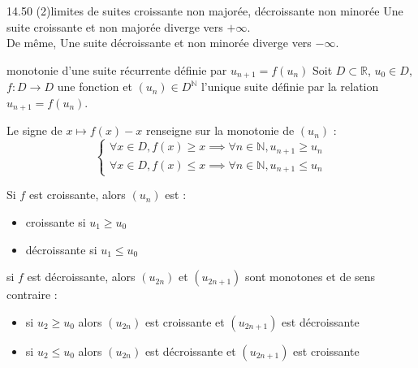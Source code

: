 \begin{adjustwidth}{-3cm}{-3cm}
\begin{proposition}{14.50 (2)}{limites de suites croissante non majorée, décroissante non minorée}
    Une suite croissante et non majorée diverge vers $+ \infty$.\\
    De même, Une suite décroissante et non minorée diverge vers $- \infty$.
\end{proposition}

\begin{theoreme}{14.65}{monotonie d'une suite récurrente définie par $u_{n+1} = f(u_n)$}
    Soit $D \subset \mathbb{R}$, $u_0 \in D$, $f:D \rightarrow D$ une fonction et $(u_n) \in D^{\mathbb{N}}$ l'unique suite définie par la relation $u_{n+1} = f(u_n)$.
        \begin{enumeratebf}
            \item Le signe de $x \mapsto f(x) - x$ renseigne sur la monotonie de $(u_n)$ :\begin{equation*}\begin{cases}
                \forall x \in D, f(x) \geq x \implies \forall n \in \mathbb{N}, u_{n+1} \geq u_n \\
                \forall x \in D, f(x) \leq x \implies \forall n \in \mathbb{N}, u_{n+1} \leq u_n 
                \end{cases}\end{equation*}
    
            \item  Si $f$ est croissante, alors $(u_n)$ est :
            \begin{itemize}
                \item croissante si $u_1 \geq u_0$
                \item décroissante si $u_1 \leq u_0$
            \end{itemize}
    
            \item si $f$ est décroissante, alors $(u_{2n})$ et $(u_{2n+1})$ sont monotones et de sens contraire :
            \begin{itemize}
                \item si $u_2 \geq u_0$ alors $(u_{2n})$ est croissante et $(u_{2n+1})$ est décroissante
                \item si $u_2 \leq u_0$ alors $(u_{2n})$ est décroissante et $(u_{2n+1})$ est croissante
            \end{itemize}
        \end{enumeratebf}
    \end{theoreme}


\end{adjustwidth}
